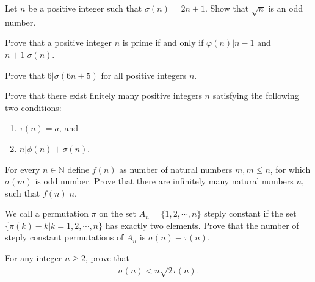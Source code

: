 \documentclass[12pt]{subfile}
\begin{document}
	\begin{problem} %
		Let $n$ be a positive integer such that $\sigma (n)=2n+1$. Show that $\sqrt n$ is an odd number.
	\end{problem}

	\begin{problem} %
		Prove that a positive integer $n$ is prime if and only if $\varphi(n)|n-1$ and $n+1|\sigma(n)$.
	\end{problem}

	\begin{problem} %
		Prove that $6|\sigma(6n+5)$ for all positive integers $n$.
	\end{problem}

	\begin{problem} %
		Prove that there exist finitely many positive integers $n$ satisfying the following two conditions:
			\begin{enumerate}
				\item $\tau (n)=a$, and
				\item $n|\phi (n)+\sigma (n)$.
			\end{enumerate}
	\end{problem}

	\begin{problem} %
		For every $n\in \mathbb{N}$ define $f(n)$ as number of natural numbers $m, m\leq n$, for which $\sigma(m)$ is odd number. Prove that there are infinitely many natural numbers $n$, such that $f(n)|n$.
	\end{problem}

	\begin{problem} %
		We call a permutation $\pi$ on the set $A_n=\{1,2,\cdots,n\}$ steply constant if the set $\{\pi (k)-k|k=1,2,\cdots,n\}$ has exactly two elements. Prove that the number of steply constant permutations of $A_n$ is $\sigma(n)-\tau (n)$.
	\end{problem}

	\begin{problem}[Belarus 1999] %
		For any integer $n\ge 2$, prove that
			\begin{align*}
				\sigma (n)<n\sqrt{2\tau (n)}.
			\end{align*}
	\end{problem}
\end{document}

